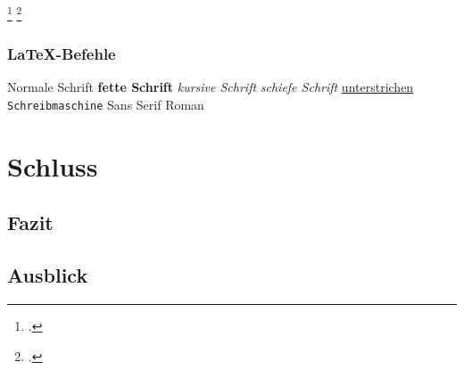 \Blindtext\footcite[Vgl. ][34]{Digitaloekonomie}
\blinditemize
\blindtext\footcite[Vgl. ][511]{Tanenbaum2016}

\subsubsection{LaTeX-Befehle}
 \textnormal{Normale Schrift} 
 \textbullet \textbf{fette Schrift} 
 \textbullet \textit{kursive Schrift} 
 \textbullet \textsl{schiefe Schrift} 
 \textbullet \underline{unterstrichen} 
 \textbullet \texttt{Schreib\-ma\-schi\-ne} 
 \textbullet \textsf{Sans Serif} 
 \textbullet \textrm{Roman} 

\section{Schluss}
\subsection{Fazit}
\Blindtext

\subsection{Ausblick}
\Blindtext
